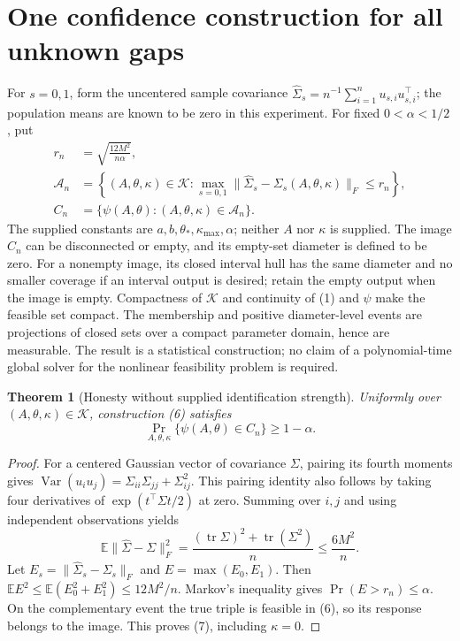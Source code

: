 \documentclass[11pt]{article}
\newtheorem{theorem}{Theorem}
\theoremstyle{definition}
\begin{document}
\section*{One confidence construction for all unknown gaps}
For $s=0,1$, form the uncentered sample covariance
$\widehat\Sigma_s=n^{-1}\sum_{i=1}^n u_{s,i}u_{s,i}^\top$;
the population means are known to be zero in this experiment.
For fixed $0<\alpha<1/2$, put
\[
 \begin{aligned}
 r_n&=\sqrt{\frac{12M^2}{n\alpha}},\\
 \mathcal A_n&=\left\{(A,\theta,\kappa)\in\mathcal K:
          \max_{s=0,1}\|\widehat\Sigma_s-\Sigma_s(A,\theta,\kappa)\|_F
                      \le r_n\right\},\\
 C_n&=\{\psi(A,\theta):(A,\theta,\kappa)\in\mathcal A_n\}.
 \end{aligned}                                          \tag{6}
\]
The supplied constants are $a,b,\theta_*,\kappa_{\max},\alpha$;
neither $A$ nor $\kappa$ is supplied. The image $C_n$ can be disconnected
or empty, and its empty-set diameter is defined to be zero. For a nonempty image, its closed
interval hull has the same diameter and no smaller coverage if an
interval output is desired; retain the empty output when the image is empty. Compactness of $\mathcal K$ and continuity
of (1) and $\psi$ make the feasible set compact. The membership and
positive diameter-level events are projections of closed sets over a
compact parameter domain, hence are measurable. The result is a
statistical construction; no claim of a polynomial-time global solver
for the nonlinear feasibility problem is required.

\begin{theorem}[Honesty without supplied identification strength]
Uniformly over $(A,\theta,\kappa)\in\mathcal K$, construction (6)
satisfies
\[
 \Pr_{A,\theta,\kappa}\{\psi(A,\theta)\in C_n\}\ge1-\alpha.
                                                        \tag{7}
\]
\end{theorem}
\begin{proof}
For a centered Gaussian vector of covariance $\Sigma$, pairing its
fourth moments gives
$\operatorname{Var}(u_i u_j)=\Sigma_{ii}\Sigma_{jj}+\Sigma_{ij}^2$.
This pairing identity also follows by taking four derivatives of
$\exp(t^\top\Sigma t/2)$ at zero.
Summing over $i,j$ and using independent observations yields
\[
 \mathbb E\|\widehat\Sigma-\Sigma\|_F^2
 =\frac{(\operatorname{tr}\Sigma)^2+\operatorname{tr}(\Sigma^2)}n
 \le\frac{6M^2}{n}.
\]
Let $E_s=\|\widehat\Sigma_s-\Sigma_s\|_F$ and
$E=\max(E_0,E_1)$. Then
$\mathbb E E^2\le\mathbb E(E_0^2+E_1^2)\le12M^2/n$.
Markov's inequality gives $\Pr(E>r_n)\le\alpha$.
On the complementary event the true triple is feasible in (6), so its
response belongs to the image. This proves (7), including $\kappa=0$.
\end{proof}
\end{document}
